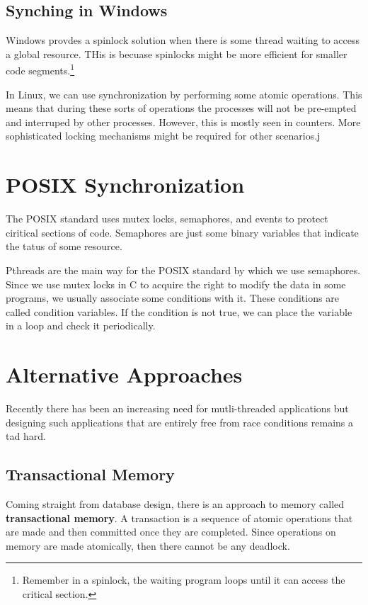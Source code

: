 \documentclass{tufte-handout}
\begin{document}
\subsection{Synching in Windows}
Windows provdes a spinlock solution when there is some thread waiting to access
a global resource. THis is becuase spinlocks might be more efficient for smaller 
code segments.\footnote{Remember in a spinlock, the waiting program loops until
it can access the critical section.}

In Linux, we can use synchronization by performing some atomic operations. This means
that during these sorts of operations the processes will not be pre-empted and 
interruped by other processes. However, this is mostly seen in counters. More 
sophisticated locking mechanisms might be required for other scenarios.j

\section{POSIX Synchronization}
The POSIX standard uses mutex locks, semaphores, and events to protect ciritical 
sections of code. Semaphores are just some binary variables that indicate the 
tatus of some resource.

Pthreads are the main way for the POSIX standard by which we use semaphores.
Since we use mutex locks in C to acquire the right to modify the data in some 
programs, we usually associate some conditions with it. These conditions
are called condition variables. If the condition is not true, we can place the
variable in a loop and check it periodically.

\section{Alternative Approaches}
Recently there has been an increasing need for mutli-threaded applications but 
designing such applications that are entirely free from race conditions remains
a tad hard.

\subsection{Transactional Memory}
Coming straight from database design, there is an approach to memory called 
\textbf{transactional memory}. A transaction is a sequence of atomic operations 
that are made and then committed once they are completed. Since operations 
on memory are made atomically, then there cannot be any deadlock.
\end{document}
